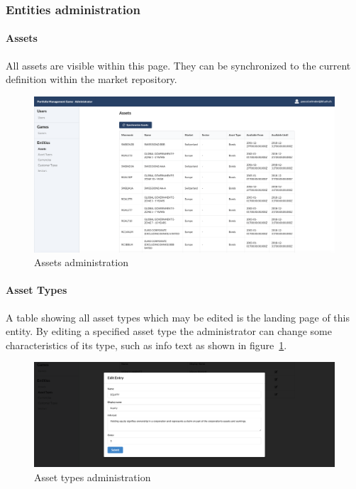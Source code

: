 \subsubsection{Entities administration}

\paragraph{Assets}
All assets are visible within this page. They can be synchronized to the current definition within the market repository. %
\begin{figure}[h!]
  \centering
  \includegraphics[scale=0.2]{img/application-overview/administrator/entities_assets.png}
  \caption{Assets administration}
\end{figure}


\paragraph{Asset Types}
A table showing all asset types which may be edited is the landing page of this entity. By editing a specified asset type the administrator can change some characteristics of its type, such as info text as shown in figure~\ref{fig:asset_types}.
\begin{figure}[h!]
  \centering
  \includegraphics[scale=0.2]{img/application-overview/administrator/entities_asset_types.png}
  \caption{Asset types administration}
  \label{fig:asset_types}
\end{figure}


